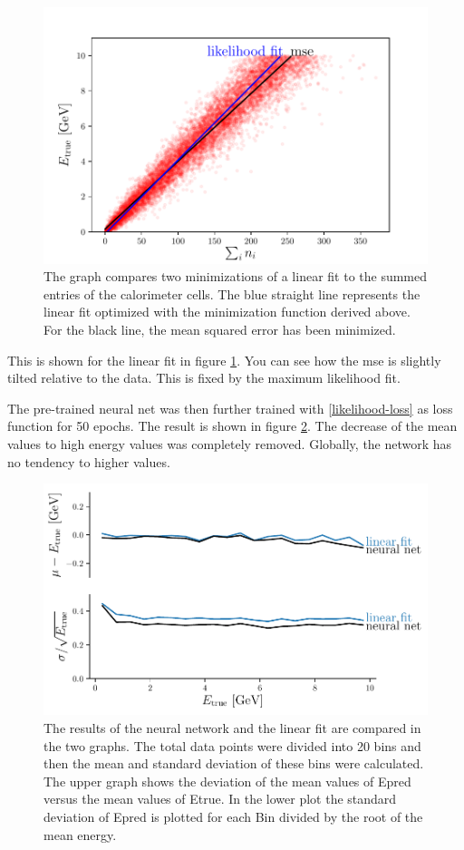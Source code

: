 \documentclass[12pt, a4paper]{thesis}
\begin{document}
\begin{figure}[H]
  \centering
  \includegraphics[width=.9\linewidth]{../images/e-vs-sum_n_like.pdf}
  \caption{ The graph compares two minimizations of a linear fit to the
    summed entries of the calorimeter cells. The blue straight line
    represents the linear fit optimized with the minimization function
    derived above. For the black line, the mean squared error has been
    minimized.}
  \label{e-vs-sum_n_like}
\end{figure}

This is shown for the linear fit in figure \ref{e-vs-sum_n_like}. You
can see how the mse is slightly tilted relative to the data. This is
fixed by the maximum likelihood fit.

 The pre-trained neural net was then
further trained with \eqref{likelihood-loss} as loss function for 50
epochs. The result is shown in figure \ref{likelihood_res}. The
decrease of the mean values to high energy values was completely
removed. Globally, the network has no tendency to higher values.

\begin{figure}[H]
  \centering
  \includegraphics[width=.9\linewidth]{../images/likelihood_res.pdf}
  \caption{ The results of the neural network and the linear fit are
    compared in the two graphs. The total data points were divided into
    20 bins and then the mean and standard deviation of these bins were
    calculated. The upper graph shows the deviation of the mean values
    of Epred versus the mean values of Etrue. In the lower plot the
    standard deviation of Epred is plotted for each Bin divided by the
    root of the mean energy.}
  \label{likelihood_res}
\end{figure}
\end{document}
